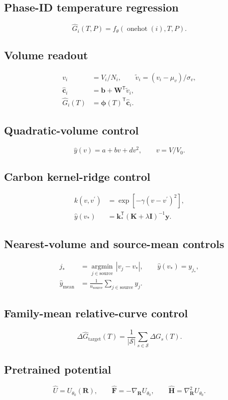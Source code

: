 \documentclass{article}
\begin{document}
\subsection*{Phase-ID temperature regression}
\[\widehat G_i(T,P)=f_\theta\!\left(\operatorname{onehot}(i),T,P\right).\]
\subsection*{Volume readout}
\[\begin{aligned}v_i&=V_i/N_i,\qquad \widetilde v_i=(v_i-\mu_v)/\sigma_v,\\\widehat{\mathbf c}_i&=\mathbf b+\mathbf W^{\mathsf T}\widetilde v_i,\\\widehat G_i(T)&=\boldsymbol\phi(T)^{\mathsf T}\widehat{\mathbf c}_i.\end{aligned}\]
\subsection*{Quadratic-volume control}
\[\hat y(v)=a+bv+dv^2,\qquad v=V/V_0.\]
\subsection*{Carbon kernel-ridge control}
\[\begin{aligned}k(v,v^\prime)&=\exp\!\left[-\gamma(v-v^\prime)^2\right],\\\hat y(v_*)&=\mathbf k_*^{\mathsf T}(\mathbf K+\lambda\mathbf I)^{-1}\mathbf y.\end{aligned}\]
\subsection*{Nearest-volume and source-mean controls}
\[\begin{aligned}j_*&=\underset{j\in\mathrm{source}}{\operatorname{argmin}}\,|v_j-v_*|,\qquad \hat y(v_*)=y_{j_*},\\\hat y_{\mathrm{mean}}&=\frac{1}{n_{\mathrm{source}}}\sum_{j\in\mathrm{source}}y_j.\end{aligned}\]
\subsection*{Family-mean relative-curve control}
\[\Delta\widehat G_{\mathrm{target}}(T)=\frac{1}{|\mathcal S|}\sum_{s\in\mathcal S}\Delta G_s(T).\]
\subsection*{Pretrained potential}
\[\widehat U=U_{\theta_0}(\mathbf R),\qquad \widehat{\mathbf F}=-\nabla_{\mathbf R}U_{\theta_0},\qquad \widehat{\mathbf H}=\nabla_{\mathbf R}^2U_{\theta_0}.\]
\end{document}
